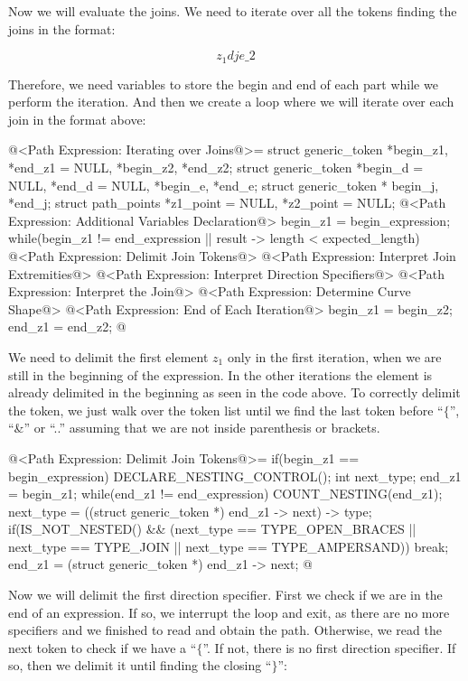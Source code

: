 Now we will evaluate the joins. We need to iterate over all the tokens
finding the joins in the format:

$$
z_1{d} j {e}\_2
$$

Therefore, we need variables to store the begin and end of each part
while we perform the iteration. And then we create a loop where we
will iterate over each join in the format above:

\iniciocodigo
@<Path Expression: Iterating over Joins@>=
{
  struct generic_token *begin_z1, *end_z1 = NULL, *begin_z2, *end_z2;
  struct generic_token *begin_d = NULL, *end_d = NULL, *begin_e, *end_e;
  struct generic_token * begin_j, *end_j;
  struct path_points *z1_point = NULL, *z2_point = NULL;
  @<Path Expression: Additional Variables Declaration@>
  begin_z1 = begin_expression;
  while(begin_z1 != end_expression || result -> length < expected_length){
    @<Path Expression: Delimit Join Tokens@>
    @<Path Expression: Interpret Join Extremities@>
    @<Path Expression: Interpret Direction Specifiers@>
    @<Path Expression: Interpret the Join@>
    @<Path Expression: Determine Curve Shape@>
    @<Path Expression: End of Each Iteration@>
    begin_z1 = begin_z2;
    end_z1 = end_z2;
  }
}
@
\fimcodigo

We need to delimit the first element $z_1$ only in the first
iteration, when we are still in the beginning of the expression. In
the other iterations the element is already delimited in the beginning
as seen in the code above. To correctly delimit the token, we just
walk over the token list until we find the last token before ``$\{$'',
``\&'' or ``..'' assuming that we are not inside parenthesis or
brackets.

\iniciocodigo
@<Path Expression: Delimit Join Tokens@>=
if(begin_z1 == begin_expression){
  DECLARE_NESTING_CONTROL();
  int next_type;
  end_z1 = begin_z1;
  while(end_z1 != end_expression){
    COUNT_NESTING(end_z1);
    next_type = ((struct generic_token *) end_z1 -> next) -> type;
    if(IS_NOT_NESTED() &&
       (next_type == TYPE_OPEN_BRACES || next_type == TYPE_JOIN ||
        next_type == TYPE_AMPERSAND))
      break;
    end_z1 = (struct generic_token *) end_z1 -> next;
  }
}
@
\fimcodigo

Now we will delimit the first direction specifier. First we check if
we are in the end of an expression. If so, we interrupt the loop and
exit, as there are no more specifiers and we finished to read and
obtain the path. Otherwise, we read the next token to check if we have
a ``$\{$''. If not, there is no first direction specifier.  If so, then
we delimit it until finding the closing ``$\}$'':

